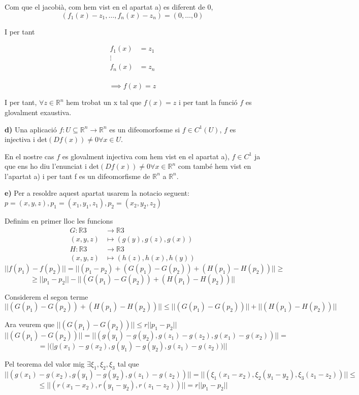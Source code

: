 \documentclass[12pt, a4papre]{article}
\begin{document}
	Com que el jacobià, com hem vist en el apartat a) es diferent de 0, 
	\[
	(f_1(x)-z_1, \hdots, f_n(x)-z_n)=(0,\hdots,0)
	\]
	
	I per tant
	
	\begin{equation}
	\begin{split}
	f_1(x)&=z_1\\
	\vdots&\\
	f_n(x)&=z_n\\
	\end{split}
	\end{equation}
	
	\[
	\implies f(x)=z
	\]
	
	I per tant, $\forall z\in \mathbb{R}^n$ hem trobat un x tal que $f(x)=z$ i per tant la funció $f$ es glovalment exaustiva.
	
	\textbf{d)} Una aplicació $f: U\subseteq \mathbb{R}^n\rightarrow\mathbb{R}^n$ es un difeomorfosme si
	$f\in C^1(U)$, $f$ es injectiva i det$(Df(x))\ne0\forall x\in U$.
	
	En el nostre cas $f$ es glovalment injectiva com hem vist en el apartat a), $f\in C^1$ ja que ens ho diu l'enunciat i 
	det$(Df(x))\ne0\forall x\in \mathbb{R}^n$ com també hem vist en l'apartat a) i per tant f es un difeomorfisme de
	$\mathbb{R}^n$ a $\mathbb{R}^n$.
	
	\textbf{e)} Per a resoldre aquest apartat usarem la notacio seguent: $p=(x,y,z), p_1=(x_1,y_1,z_1), p_2=(x_2,y_2,z_2)$
	
	Definim en primer lloc les funcions
	\begin{align*}
	G \colon \mathbb{R}3 & \to \mathbb{R}3\\
	(x,y,z) & \mapsto (g(y),g(z),g(x))\\
	H \colon \mathbb{R}3 & \to \mathbb{R}3\\
	(x,y,z) & \mapsto (h(z),h(x),h(y))
	\end{align*}
	\[
	||f(p_1)-f(p_2)||=||(p_1-p_2)+(G(p_1)-G(p_2))+(H(p_1)-H(p_2))||\geq
	\]
	\[
	\geq ||p_1-p_2||-||(G(p_1)-G(p_2))+(H(p_1)-H(p_2))||
	\]
	
	Considerem el segon terme
	\[
	||(G(p_1)-G(p_2))+(H(p_1)-H(p_2))|| \leq ||(G(p_1)-G(p_2))||+||(H(p_1)-H(p_2))||
	\]
	
	Ara veurem que $||(G(p_1)-G(p_2))|| \leq r||p_1-p_2||$
	\[
	||(G(p_1)-G(p_2))||=||(g(y_1)-g(y_2),g(z_1)-g(z_2),g(x_1)-g(x_2))||=
	\]
	\[
	=|(|g(x_1)-g(x_2),g(y_1)-g(y_2),g(z_1)-g(z_2))||
	\]
	
	Pel teorema del valor mig $\exists \xi_1, \xi_2, \xi_3$ tal que
	\[
	||(g(x_1)-g(x_2),g(y_1)-g(y_2),g(z_1)-g(z_2))||=||(\xi_1(x_1-x_2),\xi_2(y_1-y_2),\xi_3(z_1-z_2))||\leq
	\]
	\[
	\leq||(r(x_1-x_2), r(y_1-y_2),r(z_1-z_2))||=r||p_1-p_2||
	\]
	
\end{document}

